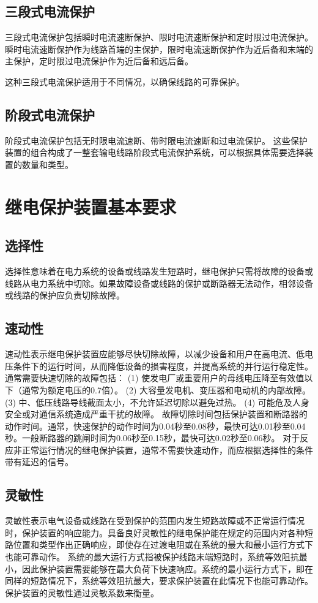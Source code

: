 \subsection{三段式电流保护}
三段式电流保护包括瞬时电流速断保护、限时电流速断保护和定时限过电流保护。
瞬时电流速断保护作为线路首端的主保护，限时电流速断保护作为近后备和末端的主保护，定时限过电流保护作为近后备和远后备。\par
这种三段式电流保护适用于不同情况，以确保线路的可靠保护。
\subsection{阶段式电流保护}
阶段式电流保护包括无时限电流速断、带时限电流速断和过电流保护。
这些保护装置的组合构成了一整套输电线路阶段式电流保护系统，可以根据具体需要选择装置的数量和类型。

\section{继电保护装置基本要求}
\subsection{选择性}
选择性意味着在电力系统的设备或线路发生短路时，继电保护只需将故障的设备或线路从电力系统中切除。如果故障设备或线路的保护或断路器无法动作，相邻设备或线路的保护应负责切除故障。
\subsection{速动性}
速动性表示继电保护装置应能够尽快切除故障，以减少设备和用户在高电流、低电压条件下的运行时间，从而降低设备的损害程度，并提高系统的并行运行稳定性。
通常需要快速切除的故障包括：
(1) 使发电厂或重要用户的母线电压降至有效值以下（通常为额定电压的0.7倍）。
(2) 大容量发电机、变压器和电动机的内部故障。
(3) 中、低压线路导线截面太小，不允许延迟切除以避免过热。
(4) 可能危及人身安全或对通信系统造成严重干扰的故障。
故障切除时间包括保护装置和断路器的动作时间。通常，快速保护的动作时间为0.04秒至0.08秒，最快可达0.01秒至0.04秒。一般断路器的跳闸时间为0.06秒至0.15秒，最快可达0.02秒至0.06秒。
对于反应非正常运行情况的继电保护装置，通常不需要快速动作，而应根据选择性的条件带有延迟的信号。
\subsection{灵敏性}
灵敏性表示电气设备或线路在受到保护的范围内发生短路故障或不正常运行情况时，保护装置的响应能力。具备良好灵敏性的继电保护能在规定的范围内对各种短路位置和类型作出正确响应，即使存在过渡电阻或在系统的最大和最小运行方式下也能可靠动作。
系统的最大运行方式指被保护线路末端短路时，系统等效阻抗最小，因此保护装置需要能够在最大负荷下快速响应。系统的最小运行方式下，即在同样的短路情况下，系统等效阻抗最大，要求保护装置在此情况下也能可靠动作。保护装置的灵敏性通过灵敏系数来衡量。
